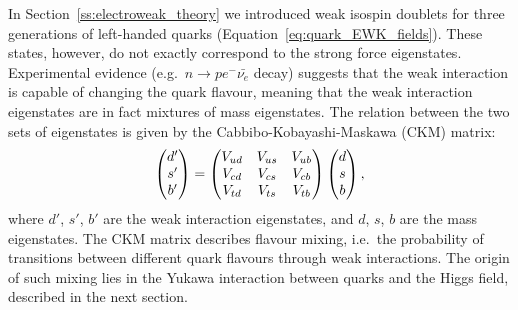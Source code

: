 In Section~\ref{ss:electroweak_theory} we introduced weak isospin doublets for three generations of left-handed quarks
(Equation~\ref{eq:quark_EWK_fields}). These states, however, do not exactly correspond to the strong force eigenstates.
Experimental evidence (e.g.\ $n \rightarrow p e^- \bar{\nu_e}$ decay) suggests that the weak interaction is capable of
changing the quark flavour, meaning that the weak interaction eigenstates are in fact mixtures of mass eigenstates. The
relation between the two sets of eigenstates is given by the Cabbibo-Kobayashi-Maskawa (CKM) matrix:
\begin{equation}
\begin{pmatrix} d' \\ s' \\ b' \end{pmatrix}
=
\begin{pmatrix}
V_{ud} & V_{us} & V_{ub}  \\
V_{cd} & V_{cs} & V_{cb}  \\
V_{td} & V_{ts} & V_{tb}
\end{pmatrix}
\begin{pmatrix} d \\ s \\ b \end{pmatrix},
\label{eq:CKM}
\end{equation}
where $d'$, $s'$, $b'$ are the weak interaction eigenstates, and $d$, $s$, $b$ are the mass eigenstates. The CKM matrix
describes flavour mixing, i.e.\ the probability of transitions between different quark flavours through weak
interactions. The origin of such mixing lies in the Yukawa interaction between quarks and the Higgs field, described in
the next section.


